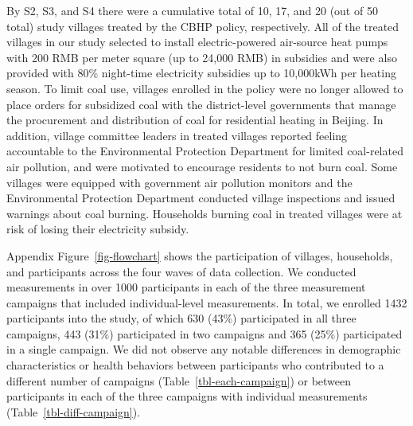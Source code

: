 \documentclass[
  letterpaper,
  DIV=11,
  numbers=noendperiod]{scrartcl}
\begin{document}
By S2, S3, and S4 there were a cumulative total of 10, 17, and 20 (out
of 50 total) study villages treated by the CBHP policy, respectively.
All of the treated villages in our study selected to install
electric-powered air-source heat pumps with 200 RMB per meter square (up
to 24,000 RMB) in subsidies and were also provided with 80\% night-time
electricity subsidies up to 10,000kWh per heating season. To limit coal
use, villages enrolled in the policy were no longer allowed to place
orders for subsidized coal with the district-level governments that
manage the procurement and distribution of coal for residential heating
in Beijing. In addition, village committee leaders in treated villages
reported feeling accountable to the Environmental Protection Department
for limited coal-related air pollution, and were motivated to encourage
residents to not burn coal. Some villages were equipped with government
air pollution monitors and the Environmental Protection Department
conducted village inspections and issued warnings about coal burning.
Households burning coal in treated villages were at risk of losing their
electricity subsidy.

Appendix Figure~\ref{fig-flowchart} shows the participation of villages,
households, and participants across the four waves of data collection.
We conducted measurements in over 1000 participants in each of the three
measurement campaigns that included individual-level measurements. In
total, we enrolled 1432 participants into the study, of which 630 (43\%)
participated in all three campaigns, 443 (31\%) participated in two
campaigns and 365 (25\%) participated in a single campaign. We did not
observe any notable differences in demographic characteristics or health
behaviors between participants who contributed to a different number of
campaigns (Table~\ref{tbl-each-campaign}) or between participants in
each of the three campaigns with individual measurements
(Table~\ref{tbl-diff-campaign}).
\end{document}

